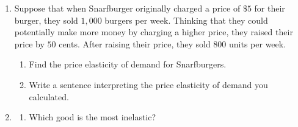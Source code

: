 \documentclass[11pt]{article}
\begin{document}
\begin{enumerate}
\begin{enumerate}
    \item What happens to the demand for soda when average consumer income rises?
    
    \item Graph the demand curve for soda when $P_{c}=100$ and $I = 10,000$.
  \end{enumerate}
  
  \newpage 
  \item Suppose that when Snarfburger originally charged a price of $\$5$ for their burger, they sold $1,000$ burgers per week. Thinking that they could potentially make more money by charging a higher price, they raised their price by $50$ cents. After raising their price, they sold $800$
  units per week. 
  
  \begin{enumerate}
    \item Find the price elasticity of demand for Snarfburgers. 
    
    \item Write a sentence interpreting the price elasticity of demand you calculated.
  \end{enumerate}
  
  \newpage
\begin{table}[htbp]
    \centering
    \caption{Estimates of the Price Elasticity of Demand for Selected Food Products}
\end{table}
\item
	\begin{enumerate}
    \item Which good is the most inelastic?
    

\end{enumerate}
\end{enumerate}
\end{document}
